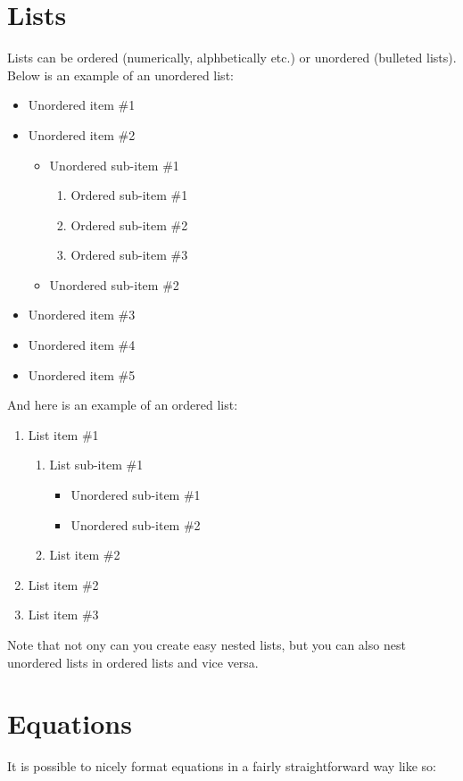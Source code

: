 \documentclass[12pt, letterpaper]{article}
\begin{document}
\newpage
\section{Lists}
Lists\cite{lists} can be ordered (numerically, alphbetically etc.) or unordered (bulleted lists). Below is an example of an unordered list:

\begin{itemize}
\item Unordered item \#1
\item Unordered item \#2
\begin{itemize}
\item Unordered sub-item \#1
\begin{enumerate}
\item Ordered sub-item \#1
\item Ordered sub-item \#2
\item Ordered sub-item \#3
\end{enumerate}
\item Unordered sub-item \#2
\end{itemize}
\item Unordered item \#3
\item Unordered item \#4
\item Unordered item \#5
\end{itemize}

And here is an example of an ordered list:
\begin{enumerate}
\item List item \#1
\begin{enumerate}
\item List sub-item \#1
\begin{itemize}
\item Unordered sub-item \#1
\item Unordered sub-item \#2
\end{itemize}
\item List item \#2
\end{enumerate}
\item List item \#2
\item List item \#3
\end{enumerate}

Note that not ony can you create easy nested lists, but you can also nest unordered lists in ordered lists and vice versa.

\newpage
\section{Equations}
It is possible to nicely format equations\cite{mathematics} in a fairly straightforward way like so:
\end{document}
